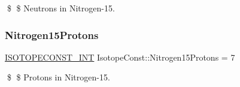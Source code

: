 \$ \$ Neutrons in Nitrogen-\/15. \mbox{\label{group___isotope_const-_nitrogen-_n15_ga85c45bc47a2081bcab63e7fac31e1111}} 
\subsubsection{\texorpdfstring{Nitrogen15\+Protons}{Nitrogen15Protons}}
{\footnotesize\ttfamily \mbox{\hyperlink{group___isotope_const-_macros_ga5f18360b3e99483a35c32d789e62621c}{I\+S\+O\+T\+O\+P\+E\+C\+O\+N\+S\+T\+\_\+\+I\+NT}} Isotope\+Const\+::\+Nitrogen15\+Protons = 7}

\$ \$ Protons in Nitrogen-\/15. 